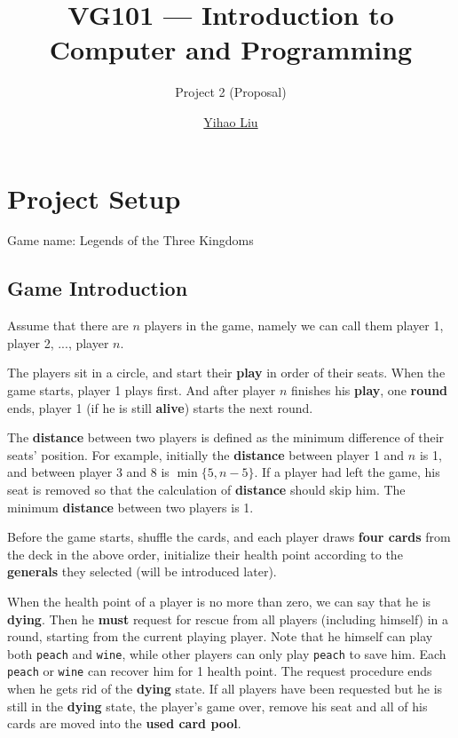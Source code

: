 \documentclass[11pt,a4paper]{article}
\title{VG101 --- Introduction to\\ Computer and Programming}
\subtitle{Project 2 (Proposal)}
\author{\href{mailto:liuyh615@sjtu.edu.cn}{Yihao Liu}}
\begin{document}
\maketitle

\section{Project Setup}

Game name: Legends of the Three Kingdoms 

\subsection{Game Introduction}

Assume that there are $n$ players in the game, namely we can call them player 1, player 2, ..., player $n$. \bigskip

The players sit in a circle, and start their \textbf{play} in order of their seats. When the game starts, player 1 plays first. And after player $n$ finishes his \textbf{play}, one \textbf{round} ends, player 1 (if he is still \textbf{alive}) starts the next round. \bigskip

The \textbf{distance} between two players is defined as the minimum difference of their seats' position. For example, initially the \textbf{distance} between player 1 and $n$ is 1, and between player 3 and 8 is $\min\{5,n-5\}$. If a player had left the game, his seat is removed so that the calculation of \textbf{distance} should skip him. The minimum \textbf{distance} between two players is 1. \bigskip

Before the game starts, shuffle the cards, and each player draws \textbf{four cards} from the deck in the above order, initialize their health point according to the \textbf{generals} they selected (will be introduced later). \bigskip

When the health point of a player is no more than zero, we can say that he is \textbf{dying}. Then he \textbf{must} request for rescue from all players (including himself) in a round, starting from the current playing player. Note that he himself can play both \texttt{peach} and \texttt{wine}, while other players can only play \texttt{peach} to save him. Each \texttt{peach} or \texttt{wine} can recover him for 1 health point. The request procedure ends when he gets rid of the \textbf{dying} state. If all players have been requested but he is still in the \textbf{dying} state, the player's game over, remove his seat and all of his cards are moved into the \textbf{used card pool}. \bigskip
\end{document}
